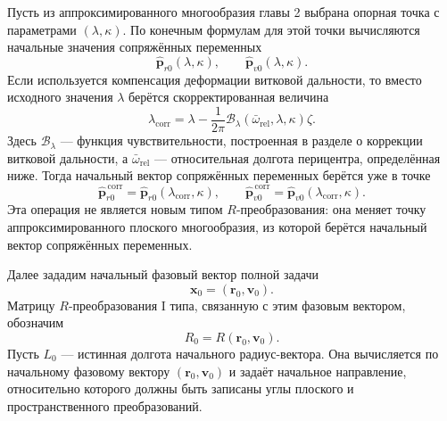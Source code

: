 Пусть из аппроксимированного многообразия главы 2 выбрана опорная точка с параметрами \((\lambda,\kappa)\). По конечным формулам для этой точки вычисляются начальные значения сопряжённых переменных
\begin{equation}
\widehat{\mathbf p}_{r0}(\lambda,\kappa),
\qquad
\widehat{\mathbf p}_{v0}(\lambda,\kappa).
\end{equation}
Если используется компенсация деформации витковой дальности, то вместо исходного значения \(\lambda\) берётся скорректированная величина
\begin{equation}
\lambda_{\mathrm{corr}}
=
\lambda
-
\frac{1}{2\pi}
\mathcal B_\lambda(\bar{\omega}_{\mathrm{rel}},\lambda,\kappa)\zeta .
\end{equation}
Здесь \(\mathcal B_\lambda\) --- функция чувствительности, построенная в разделе о коррекции витковой дальности, а \(\bar{\omega}_{\mathrm{rel}}\) --- относительная долгота перицентра, определённая ниже. Тогда начальный вектор сопряжённых переменных берётся уже в точке
\begin{equation}
\widehat{\mathbf p}_{r0}^{\,\mathrm{corr}}
=
\widehat{\mathbf p}_{r0}(\lambda_{\mathrm{corr}},\kappa),
\qquad
\widehat{\mathbf p}_{v0}^{\,\mathrm{corr}}
=
\widehat{\mathbf p}_{v0}(\lambda_{\mathrm{corr}},\kappa).
\end{equation}
Эта операция не является новым типом \(R\)-преобразования: она меняет точку аппроксимированного плоского многообразия, из которой берётся начальный вектор сопряжённых переменных.

Далее зададим начальный фазовый вектор полной задачи
\begin{equation}
\mathbf x_0=(\mathbf r_0,\mathbf v_0).
\end{equation}
Матрицу \(R\)-преобразования I типа, связанную с этим фазовым вектором, обозначим
\begin{equation}
R_0=R(\mathbf r_0,\mathbf v_0).
\end{equation}
Пусть \(L_0\) --- истинная долгота начального радиус-вектора. Она вычисляется по начальному фазовому вектору \((\mathbf r_0,\mathbf v_0)\) и задаёт начальное направление, относительно которого должны быть записаны углы плоского и пространственного преобразований.

